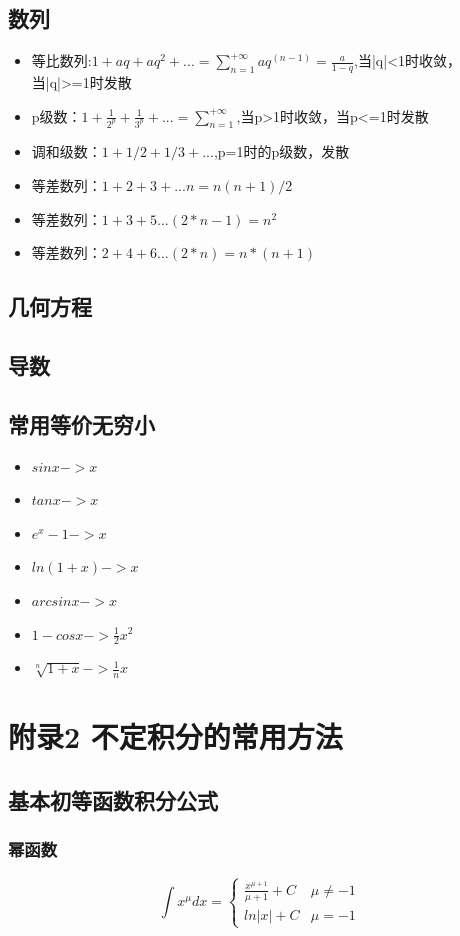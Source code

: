 \documentclass[fleqn]{article}
\begin{document}
\begin{flushleft}
\subsection{数列}
\begin{itemize}
	\item 等比数列:$1+aq+aq^2+...= \sum_{n=1}^{+\infty}aq^(n-1)=\frac{a}{1-q}$,当|q|<1时收敛，当|q|>=1时发散
	\item p级数：$1+\frac{1}{2^p}+\frac{1}{3^p}+...=\sum_{n=1}^{+\infty}$,当p>1时收敛，当p<=1时发散	
	\item 调和级数：$1+1/2+1/3+...$,p=1时的p级数，发散
	\item 等差数列：$1+2+3+...n=n(n+1)/2$
	\item 等差数列：$1+3+5...(2*n-1)=n^2$
	\item 等差数列：$2+4+6...(2*n)=n*(n+1)$
			
\end{itemize}
\subsection{几何方程}
\subsection{导数}
\subsection{常用等价无穷小}
\begin{itemize}
	\item $sinx -> x$
	\item $tanx -> x$
	\item $e^x-1 -> x$
	\item $ln(1+x) -> x$
	\item $arcsinx -> x$
	\item $1-cosx -> \frac{1}{2}x^2$
	\item $\sqrt[n]{1+x} -> \frac{1}{n}x$
\end{itemize}


\newpage
\section{附录2  不定积分的常用方法} 
	\subsection{基本初等函数积分公式}
		\subsubsection{幂函数}
		\[
			\int x^\mu dx=
			\left \{
				\begin{array}{ll}
					\frac{x^{\mu+1}}{\mu + 1} + C & \mu \neq -1 \\
								 ln|x| + C & \mu =-1
				\end{array}
			\right. 
		\]

\end{flushleft}
\end{document}
